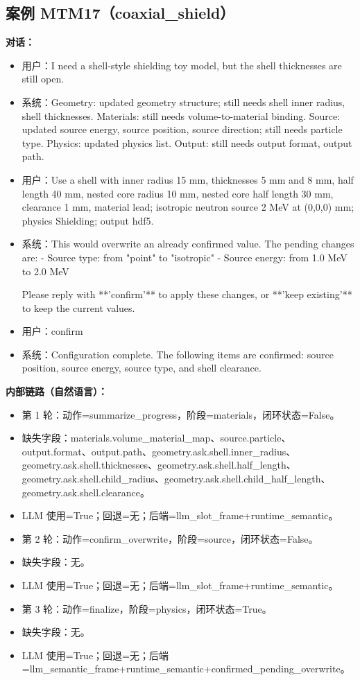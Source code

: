\documentclass[11pt]{ctexart}
\begin{document}
\subsection{案例 MTM17（coaxial\_shield）}
\textbf{对话：}
\begin{itemize}
\item 用户：I need a shell-style shielding toy model, but the shell thicknesses are still open.
\item 系统：Geometry: updated geometry structure; still needs shell inner radius, shell thicknesses. Materials: still needs volume-to-material binding. Source: updated source energy, source position, source direction; still needs particle type. Physics: updated physics list. Output: still needs output format, output path.
\item 用户：Use a shell with inner radius 15 mm, thicknesses 5 mm and 8 mm, half length 40 mm, nested core radius 10 mm, nested core half length 30 mm, clearance 1 mm, material lead; isotropic neutron source 2 MeV at (0,0,0) mm; physics Shielding; output hdf5.
\item 系统：This would overwrite an already confirmed value. The pending changes are:
- Source type: from "point" to "isotropic"
- Source energy: from 1.0 MeV to 2.0 MeV

Please reply with **'confirm'** to apply these changes, or **'keep existing'** to keep the current values.
\item 用户：confirm
\item 系统：Configuration complete. The following items are confirmed: source position, source energy, source type, and shell clearance.
\end{itemize}
\textbf{内部链路（自然语言）：}
\begin{itemize}
\item 第 1 轮：动作=summarize\_progress，阶段=materials，闭环状态=False。
\item 缺失字段：materials.volume\_material\_map、source.particle、output.format、output.path、geometry.ask.shell.inner\_radius、geometry.ask.shell.thicknesses、geometry.ask.shell.half\_length、geometry.ask.shell.child\_radius、geometry.ask.shell.child\_half\_length、geometry.ask.shell.clearance。
\item LLM 使用=True；回退=无；后端=llm\_slot\_frame+runtime\_semantic。
\item 第 2 轮：动作=confirm\_overwrite，阶段=source，闭环状态=False。
\item 缺失字段：无。
\item LLM 使用=True；回退=无；后端=llm\_slot\_frame+runtime\_semantic。
\item 第 3 轮：动作=finalize，阶段=physics，闭环状态=True。
\item 缺失字段：无。
\item LLM 使用=True；回退=无；后端=llm\_semantic\_frame+runtime\_semantic+confirmed\_pending\_overwrite。
\end{itemize}
\end{document}
